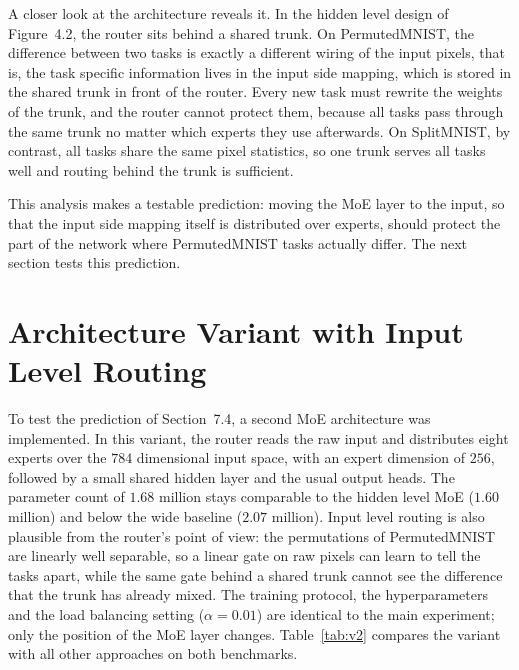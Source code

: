 A closer look at the architecture reveals it. In the hidden level design of
Figure~4.2, the router sits behind a shared trunk. On PermutedMNIST, the
difference between two tasks is exactly a different wiring of the input
pixels, that is, the task specific information lives in the input side
mapping, which is stored in the shared trunk in front of the router. Every
new task must rewrite the weights of the trunk, and the router cannot
protect them, because all tasks pass through the same trunk no matter which
experts they use afterwards. On SplitMNIST, by contrast, all tasks share
the same pixel statistics, so one trunk serves all tasks well and routing
behind the trunk is sufficient.

This analysis makes a testable prediction: moving the MoE layer to the
input, so that the input side mapping itself is distributed over experts,
should protect the part of the network where PermutedMNIST tasks actually
differ. The next section tests this prediction.

\section{Architecture Variant with Input Level Routing}
\label{sec:inputlevel}

To test the prediction of Section~7.4, a second MoE architecture was
implemented. In this variant, the router reads the raw input and
distributes eight experts over the $784$ dimensional input space, with an
expert dimension of $256$, followed by a small shared hidden layer and the
usual output heads. The parameter count of $1.68$ million stays comparable
to the hidden level MoE ($1.60$ million) and below the wide baseline
($2.07$ million). Input level routing is also plausible from the router's
point of view: the permutations of PermutedMNIST are linearly well
separable, so a linear gate on raw pixels can learn to tell the tasks
apart, while the same gate behind a shared trunk cannot see the difference
that the trunk has already mixed. The training protocol, the
hyperparameters and the load balancing setting ($\alpha = 0.01$) are
identical to the main experiment; only the position of the MoE layer
changes. Table~\ref{tab:v2} compares the variant with all other approaches on both
benchmarks.



